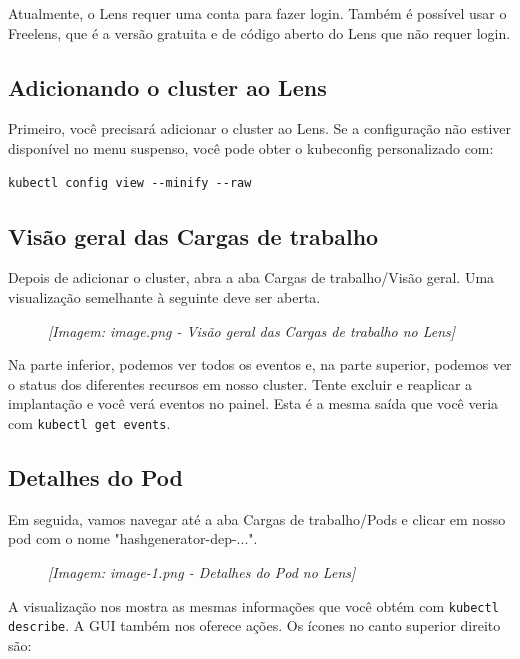 \documentclass[11pt,a4paper]{article}
\begin{document}
Atualmente, o Lens requer uma conta para fazer login. Também é possível usar o Freelens, que é a versão gratuita e de código aberto do Lens que não requer login.

\subsection{Adicionando o cluster ao Lens}

Primeiro, você precisará adicionar o cluster ao Lens. Se a configuração não estiver disponível no menu suspenso, você pode obter o kubeconfig personalizado com:

\begin{verbatim}
kubectl config view --minify --raw
\end{verbatim}

\subsection{Visão geral das Cargas de trabalho}

Depois de adicionar o cluster, abra a aba Cargas de trabalho/Visão geral. Uma visualização semelhante à seguinte deve ser aberta.

\begin{figure}[h]
\centering
\textit{[Imagem: image.png - Visão geral das Cargas de trabalho no Lens]}
\end{figure}

Na parte inferior, podemos ver todos os eventos e, na parte superior, podemos ver o status dos diferentes recursos em nosso cluster. Tente excluir e reaplicar a implantação e você verá eventos no painel. Esta é a mesma saída que você veria com \texttt{kubectl get events}.

\subsection{Detalhes do Pod}

Em seguida, vamos navegar até a aba Cargas de trabalho/Pods e clicar em nosso pod com o nome "hashgenerator-dep-...".

\begin{figure}[h]
\centering
\textit{[Imagem: image-1.png - Detalhes do Pod no Lens]}
\end{figure}

A visualização nos mostra as mesmas informações que você obtém com \texttt{kubectl describe}. A GUI também nos oferece ações. Os ícones no canto superior direito são:
\end{document}
